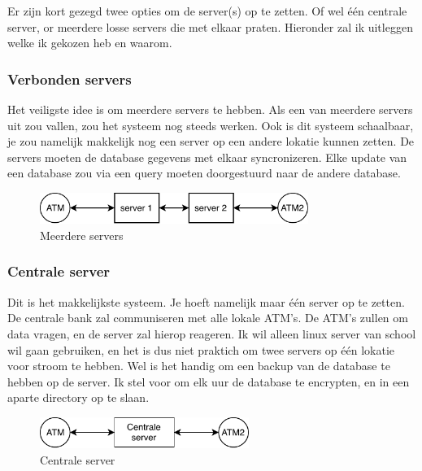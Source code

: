 \documentclass{article}
\begin{document}
Er zijn kort gezegd twee opties om de server(s) op te zetten.
Of wel \'e\'en centrale server, or meerdere losse servers die met elkaar praten.
Hieronder zal ik uitleggen welke ik gekozen heb en waarom.

\subsubsection{Verbonden servers}

Het veiligste idee is om meerdere servers te hebben.
Als een van meerdere servers uit zou vallen, zou het systeem nog steeds werken.
Ook is dit systeem schaalbaar, je zou namelijk makkelijk nog een server op een andere lokatie kunnen zetten.
De servers moeten de database gegevens met elkaar syncronizeren.
Elke update van een database zou via een query moeten doorgestuurd naar de andere database.

\begin{figure}[!h]
        \centering
        \includegraphics[height=0.4in]{meerdere_servers.pdf}
        \caption{Meerdere servers}
        \label{fig: meerdere servers}
\end{figure}

\subsubsection{Centrale server}

Dit is het makkelijkste systeem.
Je hoeft namelijk maar \'e\'en server op te zetten.
De centrale bank zal communiseren met alle lokale ATM's.
De ATM's zullen om data vragen, en de server zal hierop reageren.
Ik wil alleen linux server van school wil gaan gebruiken, en het is dus niet praktich om twee servers op \'e\'en lokatie voor stroom te hebben.
Wel is het handig om een backup van de database te hebben op de server.
Ik stel voor om elk uur de database te encrypten, en in een aparte directory op te slaan.

\begin{figure}[!h]
        \centering
        \includegraphics[height=0.4in]{centrale_server.pdf}
        \caption{Centrale server}
        \label{fig: centrale server}
\end{figure}
\end{document}
